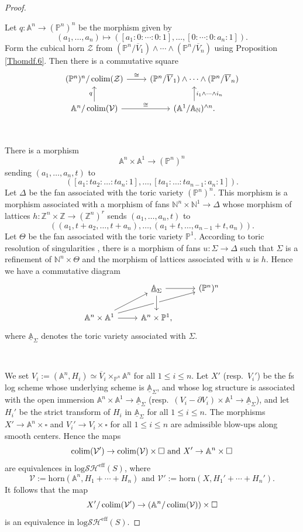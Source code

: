 \documentclass[11pt, a4paper]{amsart}
\theoremstyle{definition}
\numberwithin{equation}{subsection}
\newcommand{\N}{\mathbb{N}}
\newcommand{\Z}{\mathbb{Z}}
\renewcommand{\P}{\mathbb{P}}
\newcommand{\A}{\mathbb{A}}
\newcommand{\colimit}{\mathop{\rm colim}}
\newcommand{\ol}{\overline}
\renewcommand{\ul}{\underline}
\newcommand{\cV}{\mathcal{V}}
\newcommand{\cZ}{\mathcal{Z}}
\newcommand{\boxx}{\square}
\newcommand{\horn}{\mathrm{horn}}
\newcommand{\inflogSHS}{\mathrm{log}\mathcal{SH}^{\mathrm{eff}}}
\begin{document}
\begin{proof}
\

Let $q\colon \A^n\to (\P^n)^n$ be the morphism given by 
$$
(a_1,\ldots,a_n)\mapsto ([a_1:0:\cdots:0:1],\ldots,[0:\cdots:0:a_n:1]).
$$
Form the cubical horn $\cZ$ from $(\P^n/\ol{V}_1)\wedge \cdots \wedge (\P^n/\ol{V}_n)$ using Proposition \ref{Thomdf.6}.
Then there is a commutative square
\[
\begin{tikzcd}
(\P^n)^n/\colimit(\cZ)\ar[d,"q"',leftarrow]\ar[r,"\cong"]&
(\P^n/\ol{V}_1)\wedge \cdots \wedge (\P^n/\ol{V}_n)\ar[d,leftarrow,"i_1\wedge \cdots \wedge i_n"]
\\
\A^n/\colimit(\cV)\ar[r,"\cong"]&
(\A^1/\A_\N)^{\wedge n}.
\end{tikzcd}
\]

\

There is a morphism
\[
\A^n \times \A^1 \to (\P^n)^n
\]
sending $(a_1,\ldots,a_n,t)$ to
\[
([a_1: ta_2: \ldots:ta_n:1],\ldots,[ta_1:\ldots:ta_{n-1}:a_n:1]).
\]
Let $\Delta$ be the fan associated with the toric variety $(\P^n)^n$.
This morphism is a morphism associated with a morphism of fans $\N^n\times \N^1\to \Delta$ whose morphism of lattices $h\colon \Z^{n}\times \Z\to (\Z^n)^r$ sends $(a_1,\ldots,a_n,t)$ to
\[
((a_1,t+a_2,\ldots,t+a_n),\ldots,(a_1+t,\ldots,a_{n-1}+t,a_n)).
\]
Let $\Theta$ be the fan associated with the toric variety $\P^1$.
According to toric resolution of singularities \cite[Theorem 11.1.9]{CLStoric}, 
there is a morphism of fans $u\colon \Sigma\to \Delta$ such that $\Sigma$ is a refinement of $\N^n\times \Theta$ 
and the morphism of lattices associated with $u$ is $h$.
Hence we have a commutative diagram
\begin{equation}
\label{Ori.4.2}
\begin{tikzcd}
&
\ul{\A}_\Sigma\ar[r]&
(\P^n)^n
\\
\A^n\times \A^1\ar[r]\ar[rru]\ar[ru]&
\A^n\times \P^1,\ar[u,crossing over,leftarrow]
\end{tikzcd}
\end{equation}
where $\ul{\A}_\Sigma$ denotes the toric variety associated with $\Sigma$.

\

We set $V_i:=(\A^n,H_i)\simeq\ol{V}_i\times_{\P^n} \A^n$ for all $1\leq i\leq n$.
Let $X'$ (resp.\ $V_i'$) be the fs log scheme whose underlying scheme is $\ul{\A}_\Sigma$, 
and whose log structure is associated with the open immersion $\A^n\times \A^1\to \ul{\A}_\Sigma$ 
(resp.\ $(V_i-\partial V_i)\times \A^1\to \ul{\A}_\Sigma$), 
and let $H_i'$ be the strict transform of $H_i$ in $\ul{\A}_{\Sigma}$ for all $1\leq i\leq n$.
The morphisms $X'\to \A^n\times \boxx$ and $V_i'\to V_i\times \boxx$ for all $1\leq i\leq n$ 
are admissible blow-ups along smooth centers.
Hence the maps
\[
\colimit(\cV')\to \colimit(\cV)\times \boxx
\text{ and }
X'\to \A^n\times \boxx
\]
are equivalences in $\inflogSHS(S)$,
where
\[
\cV:=\horn(\A^n,H_1+\cdots+H_n)
\text{ and }
\cV':=\horn(X,H_1'+\cdots+H_n').
\]
It follows that the map
\begin{equation}
\label{Ori.4.3}
X'/\colimit(\cV')\to (\A^n/\colimit(\cV))\times \boxx
\end{equation}
is an equivalence in $\inflogSHS(S)$.


\end{proof}
\end{document}
